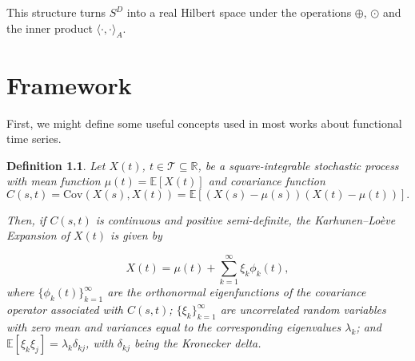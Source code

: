 \documentclass[
	12pt,				%
	oneside,			%
	a4paper,			%
	english,			%
	brazil				%
	]{abntex2ppgsi}
\newtheorem{definition}{Definition}
\begin{document}
This structure turns $S^D$ into a real Hilbert space under the operations $\oplus$, $\odot$ and the inner product $\langle \cdot, \cdot \rangle_A$.








\chapter{Framework}

First, we might define some useful concepts used in most works about functional time series. 

\begin{definition}
Let \( X(t) \), \( t \in \mathcal{T} \subseteq \mathbb{R} \), be a square-integrable stochastic process with mean function \( \mu(t) = \mathbb{E}[X(t)] \) and covariance function 
\begin{equation}
C(s, t) = \text{Cov}(X(s), X(t)) = \mathbb{E}[(X(s) - \mu(s))(X(t) - \mu(t))].
\end{equation}

Then, if \( C(s, t) \) is continuous and positive semi-definite, the Karhunen--Lo\`eve Expansion of \( X(t) \) is given by

\begin{equation}
X(t) = \mu(t) + \sum_{k=1}^\infty \xi_k \phi_k(t),
\end{equation}
where \( \{ \phi_k(t) \}_{k=1}^\infty \) are the orthonormal eigenfunctions of the covariance operator associated with \( C(s, t) \); \( \{ \xi_k \}_{k=1}^\infty \) are uncorrelated random variables with zero mean and variances equal to the corresponding eigenvalues \( \lambda_k \); and \( \mathbb{E}[\xi_k \xi_j] = \lambda_k \delta_{kj} \), with \( \delta_{kj} \) being the Kronecker delta.
\end{definition}
\end{document}
